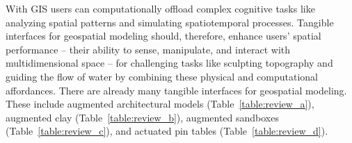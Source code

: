 \documentclass[prodmode,acmtochi]{acmsmall} %
\begin{document}

%
%
%
%
%
%


With GIS users can computationally offload complex cognitive tasks 
like analyzing spatial patterns and simulating spatiotemporal processes.
%
Tangible interfaces for geospatial modeling should, 
therefore, enhance users' spatial performance 
-- their ability to sense, manipulate, and interact with multidimensional space -- 
for challenging tasks 
like sculpting topography and guiding the flow of water
by combining these physical and computational affordances.
%
There are already many tangible interfaces for geospatial modeling.
%
These include 
augmented architectural models (Table~\ref{table:review_a}), 
augmented clay (Table~\ref{table:review_b}),  
augmented sandboxes (Table~\ref{table:review_c}), 
and actuated pin tables (Table~\ref{table:review_d}).
\end{document}
